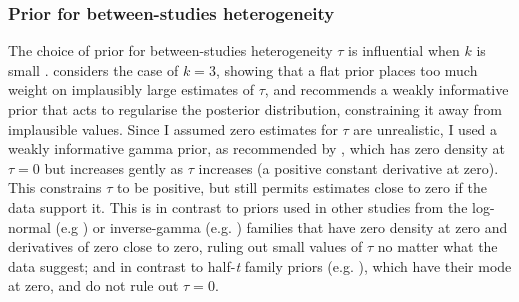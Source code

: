 \subsubsection{Prior for between-studies heterogeneity}

The choice of prior for between-studies heterogeneity $\tau$ is influential when $k$ is small \autocite{seide2019LikelihoodbasedRandomeffectsMetaanalysis}.
\textcite{gelman2006PriorDistributionsVariance} considers the case of $k=3$, showing that a flat prior places too much weight on implausibly large estimates of $\tau$, and recommends a weakly informative prior that acts to regularise the posterior distribution, constraining it away from implausible values.
%
%
%
Since I assumed zero estimates for $\tau$ are unrealistic, I used a weakly informative gamma prior, as recommended by
\textcite{chung2013NondegeneratePenalizedLikelihood}, which has zero density at $\tau = 0$ but increases gently as $\tau$ increases (a positive constant derivative at zero).
This constrains $\tau$ to be positive, but still permits estimates close to zero if the data support it.
This is in contrast to priors used in other studies from the log-normal (e.g \autocite{pullenayegum2011InformedReferencePrior,turner2015PredictiveDistributionsBetweenstudy}) or inverse-gamma (e.g. \autocite{higgins1996BorrowingStrengthExternal}) families that have zero density at zero and derivatives of zero close to zero, ruling out small values of $\tau$ no matter what the data suggest; 
and in contrast to half-\textit{t} family priors (e.g. \autocite{gelman2006PriorDistributionsVariance,seide2019LikelihoodbasedRandomeffectsMetaanalysis}), which have their mode at zero, and do not rule out $\tau=0$.


